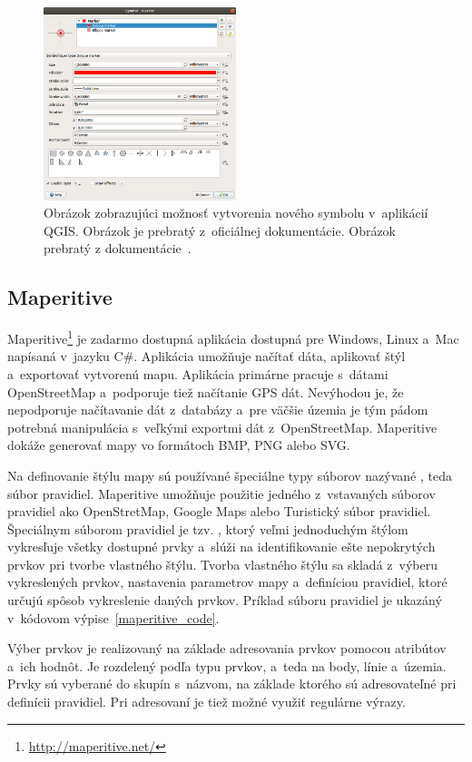\begin{figure}[hbt]
	\centering
	\includegraphics[width=0.5\textwidth]{obrazky-figures/qgis_symbol.png}
	\caption{Obrázok zobrazujúci možnosť vytvorenia nového symbolu v~aplikácií QGIS. Obrázok je prebratý z~oficiálnej dokumentácie. Obrázok prebratý z dokumentácie~\cite{qgis_img_2}.}
	\label{img_qgis_symbol}
\end{figure}

\subsection*{Maperitive}
\label{maperitive}
Maperitive\footnote{\url{http://maperitive.net/}} je zadarmo dostupná aplikácia dostupná pre Windows, Linux a~Mac napísaná v~jazyku C\#. Aplikácia umožňuje načítať dáta, aplikovať štýl a~exportovať vytvorenú mapu. Aplikácia primárne pracuje s~dátami OpenStreetMap a~podporuje tiež načítanie GPS dát. Nevýhodou je, že nepodporuje načítavanie dát z~databázy a~pre väčšie územia je tým pádom potrebná manipulácia s~veľkými exportmi dát z~OpenStreetMap. Maperitive dokáže generovať mapy vo formátoch BMP, PNG alebo SVG.

Na definovanie štýlu mapy sú používané špeciálne typy súborov nazývané , teda súbor pravidiel. Maperitive umožňuje použitie jedného z~vstavaných súborov pravidiel ako OpenStretMap, Google Maps alebo Turistický súbor pravidiel. Špeciálnym súborom pravidiel je tzv. , ktorý veľmi jednoduchým štýlom vykresľuje všetky dostupné prvky a~slúži na identifikovanie ešte nepokrytých prvkov pri tvorbe vlastného štýlu. Tvorba vlastného štýlu sa skladá z~výberu vykreslených prvkov, nastavenia parametrov mapy a~definíciou pravidiel, ktoré určujú spôsob vykreslenie daných prvkov. Príklad súboru pravidiel je ukazáný v~kódovom výpise~\ref{maperitive_code}.

Výber prvkov je realizovaný na základe adresovania prvkov pomocou atribútov a~ich hodnôt. Je rozdelený podľa typu prvkov, a~teda na body, línie a~územia. Prvky sú vyberané do skupín s~názvom, na základe ktorého sú adresovateľné pri definícii pravidiel. Pri adresovaní je tiež možné využiť regulárne výrazy. 

